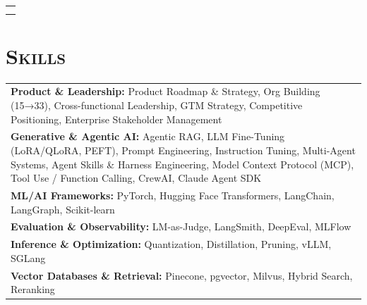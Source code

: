 \documentclass[letterpaper,11pt]{article} %
\begin{document}
\begin{tabular}{p{18.5cm}}
\begin{itemize}
\vspace*{-\baselineskip} 
\end{itemize} \\ 
\vspace{.1mm}

\end{tabular}



\section{\Large\bf\textsc{Skills}}
\begin{tabular}{p{18.5cm}}
{\bf Product \& Leadership:} Product Roadmap \& Strategy, Org Building (15→33), Cross-functional Leadership, GTM Strategy, Competitive Positioning, Enterprise Stakeholder Management\\
{\bf Generative \& Agentic AI:} Agentic RAG, LLM Fine-Tuning (LoRA/QLoRA, PEFT), Prompt Engineering, Instruction Tuning, Multi-Agent Systems, Agent Skills \& Harness Engineering, Model Context Protocol (MCP), Tool Use / Function Calling, CrewAI, Claude Agent SDK\\
{\bf ML/AI Frameworks:} PyTorch, Hugging Face Transformers, LangChain, LangGraph, Scikit-learn \\
{\bf Evaluation \& Observability:} LM-as-Judge, LangSmith, DeepEval, MLFlow\\
{\bf Inference \& Optimization:} Quantization, Distillation, Pruning, vLLM, SGLang\\
{\bf Vector Databases \& Retrieval:} Pinecone, pgvector, Milvus, Hybrid Search, Reranking\\
\end{tabular}
\end{document}
